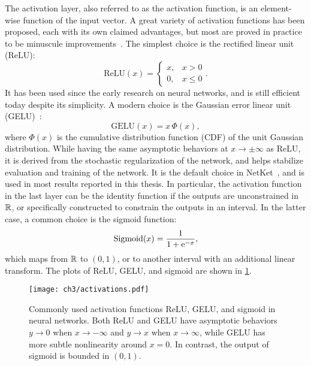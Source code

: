 The activation layer, also referred to as the activation function, is an element-wise function of the input vector. A great variety of activation functions has been proposed, each with its own claimed advantages, but most are proved in practice to be minuscule improvements~\cite{kunc2024three}. The simplest choice is the rectified linear unit (ReLU):
\begin{equation}
\text{ReLU}(x) = \begin{cases}
x, & x > 0 \\
0, & x \le 0
\end{cases}.
\end{equation}
It has been used since the early research on neural networks, and is still efficient today despite its simplicity. A modern choice is the Gaussian error linear unit (GELU)~\cite{hendrycks2016gaussian}:
\begin{equation}
\text{GELU}(x) = x\,\Phi(x),
\end{equation}
where $\Phi(x)$ is the cumulative distribution function (CDF) of the unit Gaussian distribution. While having the same asymptotic behaviors at $x \to \pm \infty$ as ReLU, it is derived from the stochastic regularization of the network, and helps stabilize evaluation and training of the network. It is the default choice in NetKet~\cite{carleo2019netket}, and is used in most results reported in this thesis. In particular, the activation function in the last layer can be the identity function if the outputs are unconstrained in $\mathbb{R}$, or specifically constructed to constrain the outputs in an interval. In the latter case, a common choice is the sigmoid function:
\begin{equation}
\text{Sigmoid}(x) = \frac{1}{1 + \mathrm{e}^{-x}},
\end{equation}
which maps from $\mathbb{R}$ to $(0, 1)$, or to another interval with an additional linear transform. The plots of ReLU, GELU, and sigmoid are shown in \cref{fig:activations}.

\begin{figure}[htb]
\centering
\texttt{[image: ch3/activations.pdf]}
\caption[Commonly used activation functions in neural networks]{
Commonly used activation functions ReLU, GELU, and sigmoid in neural networks.
Both ReLU and GELU have asymptotic behaviors $y \to 0$ when $x \to -\infty$ and $y \to x$ when $x \to \infty$, while GELU has more subtle nonlinearity around $x = 0$.
In contrast, the output of sigmoid is bounded in $(0, 1)$.
}
\label{fig:activations}
\end{figure}

